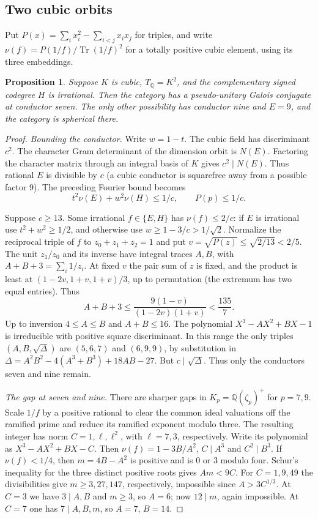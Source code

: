 \documentclass[11pt,reqno]{amsart}
\newtheorem{proposition}[theorem]{Proposition}
\theoremstyle{remark}\newtheorem{remark}[theorem]{Remark}
\numberwithin{equation}{section}
\begin{document}
\subsection{Two cubic orbits}
Put $P(x)=\sum_i x_i^2-\sum_{i<j}x_ix_j$ for triples, and write
$\nu(f)=P(1/f)/\operatorname{Tr}(1/f)^2$ for a totally positive cubic
element, using its three embeddings.
\begin{proposition}\label{prop:odd-cubic-arithmetic}
Suppose $K$ is cubic, $T_{\mathbb Q}=K^2$, and the complementary signed
codegree $H$ is irrational. Then the category has a pseudo-unitary
Galois conjugate at conductor seven. The only other possibility has
conductor nine and $E=9$, and the category is spherical there.
\end{proposition}
\begin{proof}
\textit{Bounding the conductor.} Write $w=1-t$. The cubic field has
discriminant $c^2$. The character Gram determinant of the dimension
orbit is $N(E)$. Factoring the character matrix through an integral
basis of $K$ gives $c^2\mid N(E)$. Thus rational $E$ is divisible
by $c$ (a cubic conductor is squarefree away from a possible factor
$9$). The preceding Fourier bound becomes
\[
        t^2\nu(E)+w^2\nu(H)\le1/c,\qquad P(p)\le1/c .
\]

Suppose $c\ge13$. Some irrational $f\in\{E,H\}$ has $\nu(f)\le2/c$:
if $E$ is irrational use $t^2+w^2\ge1/2$, and otherwise use
$w\ge1-3/c>1/\sqrt2$. Normalize the reciprocal triple of $f$ to
$z_0+z_1+z_2=1$ and put $v=\sqrt{P(z)}\le\sqrt{2/13}<2/5$.
The unit $z_1/z_0$ and its inverse have integral traces $A,B$, with
$A+B+3=\sum_i1/z_i$. At fixed $v$ the pair sum of $z$ is fixed,
and the product is least at $(1-2v,1+v,1+v)/3$, up to permutation
(the extremum has two equal entries). Thus
\[
  A+B+3\le\frac{9(1-v)}{(1-2v)(1+v)}<\frac{135}{7}.
\]
Up to inversion $4\le A\le B$ and $A+B\le16$. The polynomial
$X^3-AX^2+BX-1$ is irreducible with positive square discriminant.
In this range the only triples $(A,B,\sqrt\Delta)$ are $(5,6,7)$
and $(6,9,9)$, by substitution in
$\Delta=A^2B^2-4(A^3+B^3)+18AB-27$. But $c\mid\sqrt\Delta$.
Thus only the conductors seven and nine remain.

\smallskip\textit{The gap at seven and nine.} There are sharper gaps in $K_p=\mathbb Q(\zeta_p)^+$ for $p=7,9$.
Scale $1/f$ by a positive rational to clear the common ideal
valuations off the ramified prime and reduce its ramified exponent
modulo three. The resulting integer has norm $C=1,\ell,\ell^2$,
with $\ell=7,3$, respectively. Write its polynomial as
$X^3-AX^2+BX-C$. Then $\nu(f)=1-3B/A^2$, $C\mid A^3$ and $C^2\mid B^3$.
If $\nu(f)<1/4$, then $m=4B-A^2$ is positive and is $0$ or $3$
modulo four. Schur's inequality for the three distinct positive
roots gives $Am<9C$. For $C=1,9,49$ the divisibilities give
$m\ge3,27,147$, respectively, impossible since $A>3C^{1/3}$.
At $C=3$ we have $3\mid A,B$ and $m\ge3$, so $A=6$; now
$12\mid m$, again impossible. At $C=7$ one has $7\mid A,B,m$,
so $A=7$, $B=14$.


\end{proof}
\end{document}
